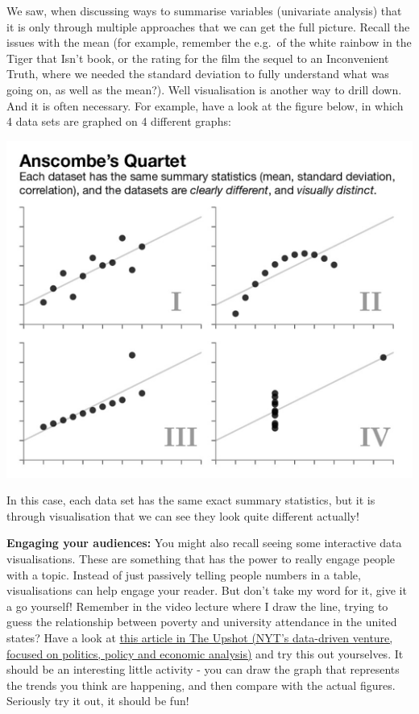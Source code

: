 \documentclass[
]{book}
\begin{document}
We saw, when discussing ways to summarise variables (univariate analysis) that it is only through multiple approaches that we can get the full picture. Recall the issues with the mean (for example, remember the e.g.~of the white rainbow in the Tiger that Isn't book, or the rating for the film the sequel to an Inconvenient Truth, where we needed the standard deviation to fully understand what was going on, as well as the mean?). Well visualisation is another way to drill down. And it is often necessary. For example, have a look at the figure below, in which 4 data sets are graphed on 4 different graphs:

\includegraphics{imgs/diff_viz_same_sums.png}

In this case, each data set has the same exact summary statistics, but it is through visualisation that we can see they look quite different actually!

\textbf{Engaging your audiences:} You might also recall seeing some interactive data visualisations. These are something that has the power to really engage people with a topic. Instead of just passively telling people numbers in a table, visualisations can help engage your reader. But don't take my word for it, give it a go yourself! Remember in the video lecture where I draw the line, trying to guess the relationship between poverty and university attendance in the united states? Have a look at \href{https://www.nytimes.com/interactive/2017/04/14/upshot/drug-overdose-epidemic-you-draw-it.html}{this article in The Upshot (NYT's data-driven venture, focused on politics, policy and economic analysis)} and try this out yourselves. It should be an interesting little activity - you can draw the graph that represents the trends you think are happening, and then compare with the actual figures. Seriously try it out, it should be fun!
\end{document}
